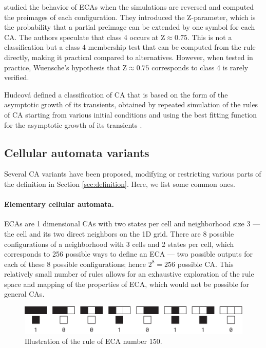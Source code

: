 \textcite{wuenscheGlobalDynamicsCellular1992} studied the behavior of \acp{ECA}
when the simulations are reversed and computed the preimages of each
configuration. They introduced the Z-parameter, which is the probability that a
partial preimage can be extended by one symbol for each \ac{CA}. The authors speculate
that class 4 occurs at $\text{Z} \approx 0.75$. This is not a classification but a
class 4 membership test that can be computed from the rule directly, making it
practical compared to alternatives. However, when tested in practice, Wuensche's
hypothesis that $\text{Z} \approx 0.75$ corresponds to class 4 is rarely verified.

Hudcová defined a classification of \ac{CA} that is based on the form of the
asymptotic growth of its transients, obtained by repeated simulation of
the rules of \ac{CA} starting from various initial conditions and using the best
fitting function for the asymptotic growth of its transients
\parencite{hudcovaClassificationComplexSystems2020,
  hudcovaClassificationDiscreteDynamical2022}.

\subsection{Cellular automata variants}

Several \ac{CA} variants have been proposed, modifying or
restricting various parts of the definition in Section \ref{sec:definition}.
Here, we list some common ones.

\paragraph{Elementary cellular automata.\label{sec:elem-cell-autom}}
\Acp{ECA} are 1 dimensional \acp{CA} with two states per cell and
neighborhood size 3 --- the cell and its two direct neighbors on the 1D grid.
There are 8 possible configurations of a neighborhood with 3 cells and 2 states
per cell, which corresponds to 256 possible ways to define an \ac{ECA} --- two
possible outputs for each of these 8 possible configurations; hence
$2^{8} = 256$ possible \ac{CA}. This relatively small number of rules allows for an
exhaustive exploration of the rule space and mapping of the properties of \ac{ECA},
which would not be possible for general \acp{CA}.

\begin{figure}[htbp]
  \centering
  \includegraphics[width=.95\linewidth]{figures/eca_150_rule}
  \caption{Illustration of the rule of \ac{ECA} number 150.}
  \label{fig:eca_150_rule}
\end{figure}

